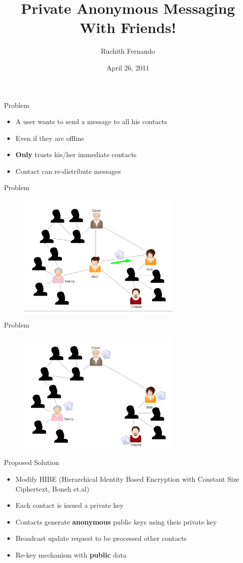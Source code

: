 \documentclass{beamer}
\title[CS 626 : Project Presentation]{Private Anonymous Messaging \\With Friends!}
\author{Ruchith Fernando}
\institute{Purdue University}
\date{April 26, 2011}
\begin{document}
\begin{frame}
\titlepage
\end{frame}


\begin{frame}{Problem}
\begin{itemize}
\item A user wants to send a message to all his contacts
\item Even if they are offline
\item \textbf{Only} trusts his/her immediate contacts
\item Contact can re-distribute messages
\end{itemize}
\end{frame}


\begin{frame}{Problem}
\begin{figure}
\includegraphics[height=6cm]{img/img1.png} 
\end{figure}
\end{frame}


\begin{frame}{Problem}
\begin{figure}
\includegraphics[height=6cm]{img/img2.png} 
\end{figure}
\end{frame}

\begin{frame}{Proposed Solution}
\begin{itemize}
\item Modify HIBE (Hierarchical Identity Based Encryption with
Constant Size Ciphertext, Boneh et.al)
\item Each contact is issued a private key
\item Contacts generate \textbf{anonymous} public keys using theis private key
\item Broadcast update request to be processed other contacts 
\item Re-key mechanism with \textbf{public} data
\end{itemize}
\end{frame}
\end{document}
